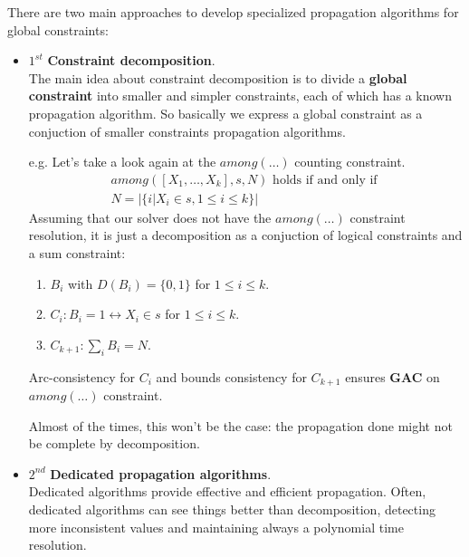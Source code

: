There are two main approaches to develop specialized propagation algorithms for global constraints:
\begin{itemize}
    \renewcommand{\labelitemi}{}
    \item $1^{st}$ \textbf{Constraint decomposition}. \\
    The main idea about constraint decomposition is to divide a \textbf{global constraint} into smaller and simpler constraints, each of which has a 
    known propagation algorithm. So basically we express a global constraint as a conjuction of smaller constraints propagation algorithms.
    \begin{example}
        e.g. Let's take a look again at the $\textit{among}(\dots)$ counting constraint. 
        $$ 
            \begin{gathered}
                \textit{among}([X_1, \dots, X_k], s, N) \text{ holds if and only if } \\
                N = |\{i | X_i \in s, 1 \leq i \leq k \}|
            \end{gathered}
        $$
        Assuming that our solver does not have the $\textit{among}(\dots)$ constraint resolution, it is just a decomposition as a conjuction of logical
        constraints and a sum constraint:
        \begin{enumerate}
            \item $B_i$ with $D(B_i) = \{0, 1\}$ for $1 \leq i \leq k$.
            \item $C_i: B_i = 1 \leftrightarrow X_i \in s$ for $1 \leq i \leq k$.
            \item $C_{k+1}: \sum_{i} B_i = N$.
        \end{enumerate} \vspace{7pt}

        Arc-consistency for $C_i$ and bounds consistency for $C_{k+1}$ ensures \textbf{GAC} on $\textit{among}(\dots)$ constraint.
    \end{example}
    Almost of the times, this won't be the case: the propagation done might not be complete by decomposition.
    \item $2^{nd}$ \textbf{Dedicated propagation algorithms}. \\
    Dedicated algorithms provide effective and efficient propagation. Often, dedicated algorithms can see things better than decomposition, detecting 
    more inconsistent values and maintaining always a polynomial time resolution. \vspace{7pt}


\end{itemize}
